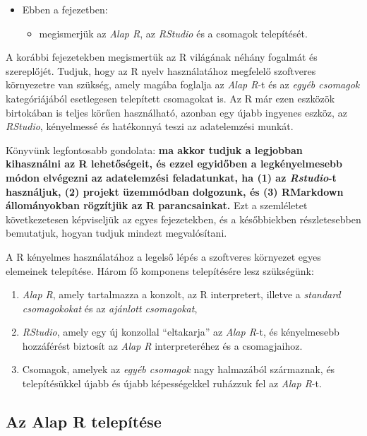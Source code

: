\documentclass[
]{book}
\providecommand{\tightlist}{%
  \setlength{\itemsep}{0pt}\setlength{\parskip}{0pt}}
\newenvironment{rmdblock}[1]
  {\begin{shaded*}
  \begin{itemize}
  \renewcommand{\labelitemi}{
    \raisebox{-.7\height}[0pt][0pt]{
      {\setkeys{Gin}{width=3em,keepaspectratio}\texttt{[image: images/\#1]}}
    }
  }
  \item
  }
  {
  \end{itemize}
  \end{shaded*}
  }
\newenvironment{rmdlevel1}
  {\begin{rmdblock}{level1}}
  {\end{rmdblock}}
\begin{document}
\begin{rmdlevel1}
Ebben a fejezetben:

\begin{itemize}
\tightlist
\item
  megismerjük az \emph{Alap R}, az \emph{RStudio} és a csomagok
  telepítését.
\end{itemize}
\end{rmdlevel1}

A korábbi fejezetekben megismertük az R világának néhány fogalmát és szereplőjét. Tudjuk, hogy az R nyelv használatához megfelelő szoftveres környezetre van szükség, amely magába foglalja az \emph{Alap R}-t és az \emph{egyéb csomagok} kategóriájából esetlegesen telepített csomagokat is. Az R már ezen eszközök birtokában is teljes körűen használható, azonban egy újabb ingyenes eszköz, az \emph{RStudio}, kényelmessé és hatékonnyá teszi az adatelemzési munkát.

Könyvünk legfontosabb gondolata: \textbf{ma akkor tudjuk a legjobban kihasználni az R lehetőségeit, és ezzel egyidőben a legkényelmesebb módon elvégezni az adatelemzési feladatunkat, ha (1) az \emph{Rstudio}-t használjuk, (2) projekt üzemmódban dolgozunk, és (3) RMarkdown állományokban rögzítjük az R parancsainkat.} Ezt a szemléletet következetesen képviseljük az egyes fejezetekben, és a későbbiekben részletesebben bemutatjuk, hogyan tudjuk mindezt megvalósítani.

A R kényelmes használatához a legelső lépés a szoftveres környezet egyes elemeinek telepítése. Három fő komponens telepítésére lesz szükségünk:

\begin{enumerate}
\def\labelenumi{\arabic{enumi}.}
\tightlist
\item
  \emph{Alap R}, amely tartalmazza a konzolt, az R interpretert, illetve a \emph{standard csomagokokat} és az \emph{ajánlott csomagokat},
\item
  \emph{RStudio}, amely egy új konzollal ``eltakarja'' az \emph{Alap R}-t, és kényelmesebb hozzáférést biztosít az \emph{Alap R} interpreteréhez és a csomagjaihoz.
\item
  Csomagok, amelyek az \emph{egyéb csomagok} nagy halmazából származnak, és telepítésükkel újabb és újabb képességekkel ruházzuk fel az \emph{Alap R}-t.
\end{enumerate}

\hypertarget{az-alap-r-telepuxedtuxe9se}{%
\subsection{Az Alap R telepítése}\label{az-alap-r-telepuxedtuxe9se}}
\end{document}
